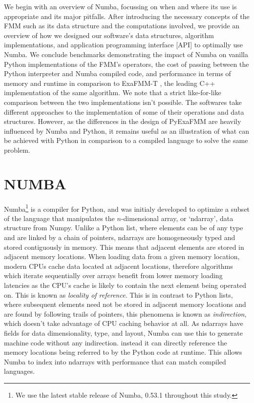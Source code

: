 \documentclass{IEEEcsmag}
\begin{document}
We begin with an overview of Numba, focussing on when and where its use is appropriate and its major pitfalls. After introducing the necessary concepts of the FMM such as its data structure and the computations involved, we provide an overview of how we designed our software's data structures, algorithm implementations, and application programming interface [API] to optimally use Numba. We conclude benchmarks demonstrating the impact of Numba on vanilla Python implementations of the FMM's operators, the cost of passing between the Python interpreter and Numba compiled code, and performance in terms of memory and runtime in comparison to ExaFMM-T \cite{Wang2021}, the leading C++ implementation of the same algorithm. We note that a strict like-for-like comparison between the two implementations isn't possible. The softwares take different approaches to the implementation of some of their operations and data structures. However, as the differences in the design of PyExaFMM are heavily influenced by Numba and Python, it remains useful as an illustration of what can be achieved with Python in comparison to a compiled language to solve the same problem.

\section{NUMBA}

Numba\footnote{We use the latest stable release of Numba, 0.53.1 throughout this study.} is a compiler for Python, and was initialy developed to optimize a subset of the language that manipulates the $n$-dimensional array, or `ndarray', data structure from Numpy. Unlike a Python list, where elements can be of any type and are linked by a chain of pointers, ndarrays are homogeneously typed and stored contiguously in memory. This means that adjacent elements are stored in adjacent memory locations. When loading data from a given memory location, modern CPUs cache data located at adjacent locations, therefore algorithms which iterate sequentially over arrays benefit from lower memory loading latencies as the CPU's cache is likely to contain the next element being operated on. This is known as \textit{locality of reference}. This is in contrast to Python lists, where subsequent elements need not be stored in adjacent memory locations and are found by following trails of pointers, this phenomena is known as \textit{indirection}, which doesn't take advantage of CPU caching behavior at all. As ndarrays have fields for data dimensionality, type, and layout, Numba can use this to generate machine code without any indirection. instead it can directly reference the memory locations being referred to by the Python code at runtime. This allows Numba to index into ndarrays with performance that can match compiled languages.
\end{document}
